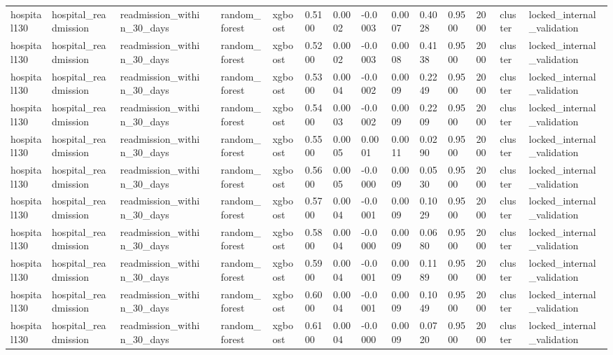 \begin{tabular}{lllllllllllllll}
hospital130 & hospital\_readmission & readmission\_within\_30\_days &  & random\_forest & xgboost & 0.5100 & 0.0002 & -0.0003 & 0.0007 & 0.4028 & 0.9500 & 2000 & cluster & locked\_internal\_validation \\
hospital130 & hospital\_readmission & readmission\_within\_30\_days &  & random\_forest & xgboost & 0.5200 & 0.0002 & -0.0003 & 0.0008 & 0.4138 & 0.9500 & 2000 & cluster & locked\_internal\_validation \\
hospital130 & hospital\_readmission & readmission\_within\_30\_days &  & random\_forest & xgboost & 0.5300 & 0.0004 & -0.0002 & 0.0009 & 0.2249 & 0.9500 & 2000 & cluster & locked\_internal\_validation \\
hospital130 & hospital\_readmission & readmission\_within\_30\_days &  & random\_forest & xgboost & 0.5400 & 0.0003 & -0.0002 & 0.0009 & 0.2209 & 0.9500 & 2000 & cluster & locked\_internal\_validation \\
hospital130 & hospital\_readmission & readmission\_within\_30\_days &  & random\_forest & xgboost & 0.5500 & 0.0005 & 0.0001 & 0.0011 & 0.0290 & 0.9500 & 2000 & cluster & locked\_internal\_validation \\
hospital130 & hospital\_readmission & readmission\_within\_30\_days &  & random\_forest & xgboost & 0.5600 & 0.0005 & -0.0000 & 0.0009 & 0.0530 & 0.9500 & 2000 & cluster & locked\_internal\_validation \\
hospital130 & hospital\_readmission & readmission\_within\_30\_days &  & random\_forest & xgboost & 0.5700 & 0.0004 & -0.0001 & 0.0009 & 0.1029 & 0.9500 & 2000 & cluster & locked\_internal\_validation \\
hospital130 & hospital\_readmission & readmission\_within\_30\_days &  & random\_forest & xgboost & 0.5800 & 0.0004 & -0.0000 & 0.0009 & 0.0680 & 0.9500 & 2000 & cluster & locked\_internal\_validation \\
hospital130 & hospital\_readmission & readmission\_within\_30\_days &  & random\_forest & xgboost & 0.5900 & 0.0004 & -0.0001 & 0.0009 & 0.1189 & 0.9500 & 2000 & cluster & locked\_internal\_validation \\
hospital130 & hospital\_readmission & readmission\_within\_30\_days &  & random\_forest & xgboost & 0.6000 & 0.0004 & -0.0001 & 0.0009 & 0.1049 & 0.9500 & 2000 & cluster & locked\_internal\_validation \\
hospital130 & hospital\_readmission & readmission\_within\_30\_days &  & random\_forest & xgboost & 0.6100 & 0.0004 & -0.0000 & 0.0009 & 0.0720 & 0.9500 & 2000 & cluster & locked\_internal\_validation \\

\end{tabular}
